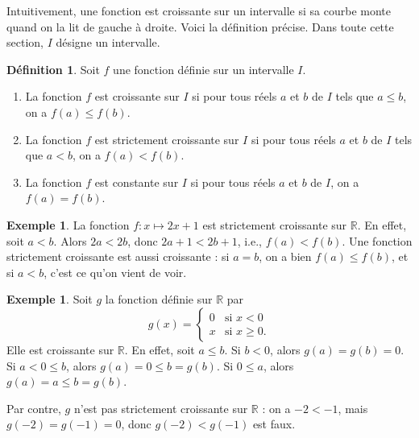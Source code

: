 \documentclass[12pt,a4paper]{article}
\theoremstyle{plain}
\theoremstyle{definition}
\newtheorem{definition}[theorem]{Définition}
\newtheorem{example}[theorem]{Exemple}
\theoremstyle{remark}
\begin{document}
Intuitivement, une fonction est croissante sur un intervalle si sa courbe monte
quand on la lit de gauche à droite. Voici la définition précise. Dans toute cette
section, $I$ désigne un intervalle.

\begin{tcolorbox}[navybar]
  \begin{definition}
    Soit $f$ une fonction définie sur un intervalle $I$.
    \begin{enumerate}[label=(\roman*)]
      \item\label{def:croissante} La fonction $f$ est croissante sur $I$ si pour tous
      réels $a$ et $b$ de $I$ tels que $a \le b$, on a $f(a) \le f(b)$.
      \item\label{def:strict_croissante} La fonction $f$ est strictement croissante sur
      $I$ si pour tous réels $a$ et $b$ de $I$ tels que $a < b$, on a $f(a) < f(b)$.
      \item\label{def:constante} La fonction $f$ est constante sur $I$ si pour tous
      réels $a$ et $b$ de $I$, on a $f(a) = f(b)$.
    \end{enumerate}
  \end{definition}
\end{tcolorbox}

\begin{example}
  La fonction $f : x \mapsto 2x + 1$ est strictement croissante sur $\mathbb{R}$. En
  effet, soit $a < b$. Alors $2a < 2b$, donc $2a + 1 < 2b + 1$, i.e., $f(a) < f(b)$.
  Une fonction strictement croissante est aussi croissante : si $a = b$, on a bien
  $f(a) \le f(b)$, et si $a < b$, c'est ce qu'on vient de voir.
\end{example}

\begin{example}
  Soit $g$ la fonction définie sur $\mathbb{R}$ par
  \[
  g(x) =
  \begin{cases}
    0 & \text{si } x < 0 \\
    x & \text{si } x \ge 0.
  \end{cases}
  \]
  Elle est croissante sur $\mathbb{R}$. En effet, soit $a \le b$. Si $b < 0$, alors
  $g(a) = g(b) = 0$. Si $a < 0 \le b$, alors $g(a) = 0 \le b = g(b)$. Si $0 \le a$,
  alors $g(a) = a \le b = g(b)$.
  
  Par contre, $g$ n'est pas strictement croissante sur $\mathbb{R}$ : on a $-2 < -1$,
  mais $g(-2) = g(-1) = 0$, donc $g(-2) < g(-1)$ est faux.
\end{example}
\end{document}
